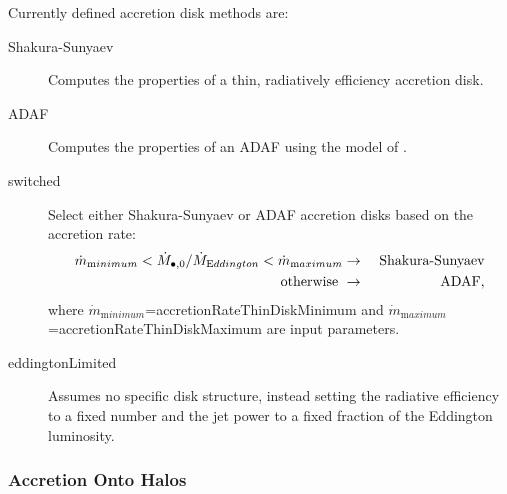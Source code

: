 Currently defined accretion disk methods are:
\begin{description}
 \item [{\normalfont \ttfamily Shakura-Sunyaev}] Computes the properties of a thin, radiatively efficiency accretion disk.
 \item [{\normalfont \ttfamily ADAF}] Computes the properties of an ADAF using the model of \cite{benson_maximum_2009}.
 \item [{\normalfont \ttfamily switched}] Select either {\normalfont \ttfamily Shakura-Sunyaev} or {\normalfont \ttfamily ADAF} accretion disks based on the accretion rate:
 \begin{eqnarray}
  \dot{m}_{\mathrm minimum} < \dot{M}_{\bullet, 0}/\dot{M}_{\mathrm Eddington} < \dot{m}_{\mathrm maximum} &\rightarrow& \hbox{ Shakura-Sunyaev} \nonumber \\
  \hbox{otherwise } &\rightarrow& \hbox{ ADAF},
 \end{eqnarray}
 where $\dot{m}_{\mathrm minimum}$={\normalfont \ttfamily accretionRateThinDiskMinimum} and $\dot{m}_{\mathrm maximum}$={\normalfont \ttfamily accretionRateThinDiskMaximum} are input parameters.
 \item [{\normalfont \ttfamily eddingtonLimited}] Assumes no specific disk structure, instead setting the radiative efficiency to a fixed number and the jet power to a fixed fraction of the Eddington luminosity.
\end{description}

\subsubsection{Accretion Onto Halos}

